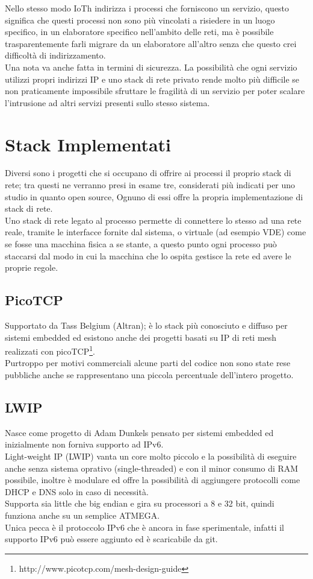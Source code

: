 Nello stesso modo IoTh indirizza i processi che forniscono un servizio, questo significa che questi processi non sono pi\`u vincolati a risiedere in un luogo specifico, in un elaboratore specifico nell'ambito delle reti, ma \`e possibile trasparentemente farli migrare da un elaboratore all'altro senza che questo crei difficolt\`a di indirizzamento.\\
Una nota va anche fatta in termini di sicurezza. La possibilit\`a che ogni servizio utilizzi propri indirizzi IP e uno stack di rete privato rende molto pi\`u difficile se non praticamente impossibile sfruttare le fragilit\`a di un servizio per poter scalare l'intrusione ad altri servizi presenti sullo stesso sistema.

\section{Stack Implementati}
Diversi sono i progetti che si occupano di offrire ai processi il proprio stack di rete; tra questi ne verranno presi in esame tre, considerati pi\`u indicati per uno studio in quanto open source, Ognuno di essi offre la propria implementazione di stack di rete.\\
Uno stack di rete legato al processo permette di connettere lo stesso ad una rete reale, tramite le interfacce fornite dal sistema, o virtuale (ad esempio VDE) come se fosse una macchina fisica a se stante, a questo punto ogni processo pu\`o staccarsi dal modo in cui la macchina che lo ospita gestisce la rete ed avere le proprie regole.\\

\subsection{PicoTCP}
Supportato da Tass Belgium (Altran); \`e lo stack pi\`u conosciuto e diffuso per sistemi embedded ed esistono anche dei progetti basati su IP di reti mesh realizzati con picoTCP\footnote{http://www.picotcp.com/mesh-design-guide}.\\
Purtroppo per motivi commerciali alcune parti del codice non sono state rese pubbliche anche se rappresentano una piccola percentuale dell'intero progetto.
\subsection{LWIP}
Nasce come progetto di Adam Dunkels pensato per sistemi embedded ed inizialmente non forniva supporto ad IPv6.\\
Light-weight IP (LWIP) vanta un core molto piccolo e la possibilit\`a di eseguire anche senza sistema oprativo (single-threaded) e con il minor consumo di RAM possibile, inoltre \`e modulare ed offre la possibilit\`a di aggiungere protocolli come DHCP e DNS solo in caso di necessit\`a.\\
Supporta sia little che big endian e gira su processori a 8 e 32 bit, quindi funziona anche su un semplice ATMEGA.\\
Unica pecca \`e il protoccolo IPv6 che \`e ancora in fase sperimentale, infatti il supporto IPv6 pu\`o essere aggiunto ed \`e scaricabile da git.
